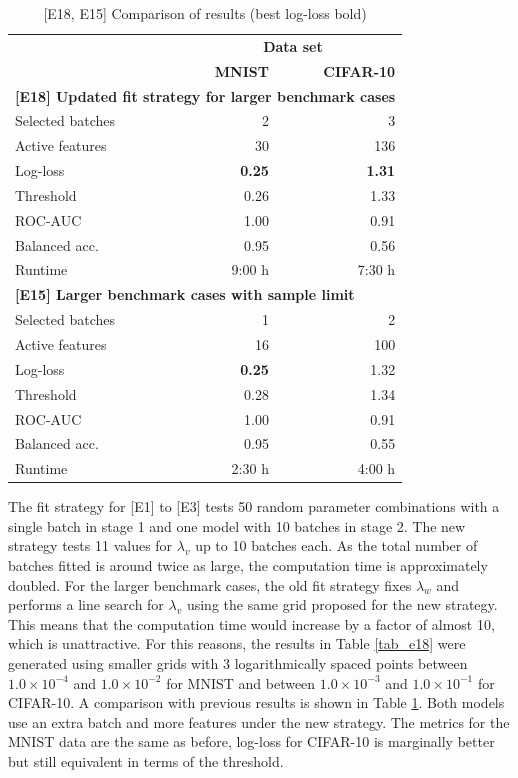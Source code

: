 %
\begin{table}
\caption{[E18, E15] Comparison of results (best log-loss bold)}
\label{tab_e18_e15}
%
\begin{center}
\small
\begin{tabular}{|lrr|}
\hline
&\multicolumn{2}{c|}{\textbf{\hrulefill\ Data set \hrulefill}}\\
&\textbf{MNIST}&\textbf{CIFAR-10}\\
\multicolumn{3}{|l|}{\textbf{[E18] Updated fit strategy for larger benchmark cases}}\\
Selected batches&2&3\\
Active features&30&136\\
Log-loss&\textbf{0.25}&\textbf{1.31}\\
Threshold&0.26&1.33\\
ROC-AUC&1.00&0.91\\
Balanced acc.&0.95&0.56\\
Runtime&9:00 h&7:30 h\\
\multicolumn{3}{|l|}{\textbf{[E15] Larger benchmark cases with sample limit}}\\
Selected batches&1&2\\
Active features&16&100\\
Log-loss&\textbf{0.25}&1.32\\
Threshold&0.28&1.34\\
ROC-AUC&1.00&0.91\\
Balanced acc.&0.95&0.55\\
Runtime&2:30 h&4:00 h\\
\hline
\end{tabular}
\end{center}
\end{table}
%
The fit strategy for [E1] to [E3] tests 50 random parameter combinations with a single batch in stage 1 and one model with 10 batches in stage 2.
The new strategy tests 11 values for $\lambda_v$ up to 10 batches each.
As the total number of batches fitted is around twice as large, the computation time is approximately doubled.
For the larger benchmark cases, the old fit strategy fixes $\lambda_w$ and performs a line search for $\lambda_v$ using the same grid proposed for the new strategy.
This means that the computation time would increase by a factor of almost 10, which is unattractive.
For this reasons, the results in Table \ref{tab_e18} were generated using smaller grids with 3 logarithmically spaced points between $1.0\times10^{-4}$ and $1.0\times10^{-2}$ for MNIST and between $1.0\times10^{-3}$ and $1.0\times10^{-1}$ for CIFAR-10.
A comparison with previous results is shown in Table \ref{tab_e18_e15}.
Both models use an extra batch and more features under the new strategy.
The metrics for the MNIST data are the same as before, log-loss for CIFAR-10 is marginally better but still equivalent in terms of the threshold.
\endinput
